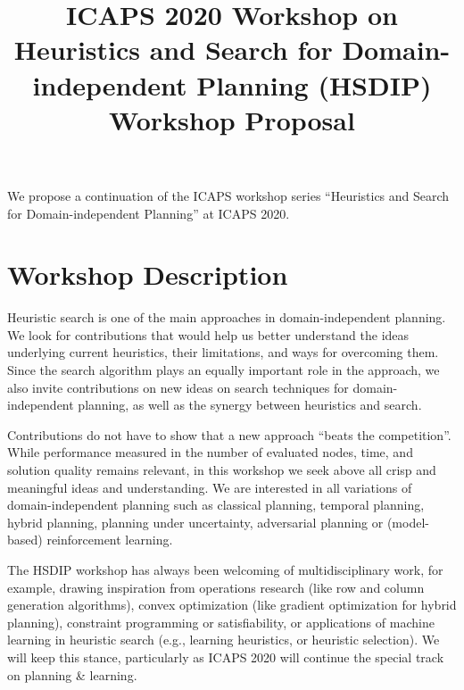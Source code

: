 \documentclass[10pt]{article}
\begin{document}
\title{ICAPS 2020 Workshop on \\ Heuristics and Search for Domain-independent
Planning (HSDIP)\\ \vspace*{0.7cm} Workshop Proposal
}
\date{}

\author{}

\maketitle

\vspace{-0.5cm}


We propose a continuation of the ICAPS workshop series ``Heuristics
and Search for Domain-independent Planning'' at ICAPS 2020.

\section*{Workshop Description}
Heuristic search is one of the main approaches in domain-independent
planning.  We look for contributions that would help us better
understand the ideas underlying current heuristics, their limitations,
and ways for overcoming them.
%
Since the search algorithm plays an equally important role in the
approach, we also invite contributions on new ideas on search
techniques for domain-independent planning, as well as the synergy
between heuristics and search.

Contributions do not have to show that a new approach ``beats the competition''.
While performance measured in the number of evaluated nodes, time, and solution
quality remains relevant, in this workshop we seek above all crisp and
meaningful ideas and understanding.
%
We are interested in all variations of domain-independent planning
such as classical planning, temporal planning, hybrid planning, planning under
uncertainty, adversarial planning or (model-based) reinforcement learning.

The HSDIP workshop has always been welcoming of multidisciplinary work,
for example, drawing inspiration from operations research (like row and
column generation algorithms), convex optimization (like gradient
optimization for hybrid planning), constraint programming or
satisfiability, or applications of machine learning in heuristic search
(e.g., learning heuristics, or heuristic selection). We will keep this
stance, particularly as ICAPS 2020 will continue the special track on
planning \& learning.
\end{document}
